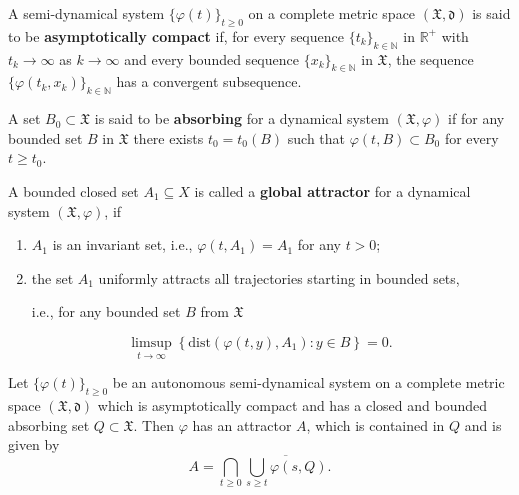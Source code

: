 \documentclass[11pt]{beamer}
\begin{document}

\begin{frame}
    \begin{definition} 
        A semi-dynamical
         system $\{\varphi(t)\}_{t \geq 0}$ on a 
         complete metric space $(\mathfrak{X}, \mathfrak{d})$ is 
         said to be \textbf{asymptotically compact} if, 
         for every sequence $\{t_k\}_{k \in \mathbb{N}}$ 
         in $\mathbb{R}^+$ with $t_k \rightarrow \infty$ 
         as $k \rightarrow \infty$ and every bounded 
         sequence $\{x_k\}_{k \in \mathbb{N}}$ in 
         $\mathfrak{X}$, the sequence 
         $\{\varphi(t_k, x_k)\}_{k \in \mathbb{N}}$ has a 
         convergent subsequence.
    \end{definition}
    \begin{definition}
    A set $B_0 \subset \mathfrak{X}$ is said to be \textbf{absorbing} for a dynamical system $(\mathfrak{X}, \varphi)$ if for any bounded set $B$ in $\mathfrak{X}$ there exists $t_0 = t_0(B)$ such that $\varphi(t, B) \subset B_0$ for every $t \geq t_0$.
    \end{definition}

\end{frame}

\begin{frame}
    A bounded closed set $A_1 \subseteq X$ is called a \textbf{global attractor} for a dynamical system $(\mathfrak{X}, \varphi)$, if
\begin{enumerate}
\item $A_1$ is an invariant set, i.e., $\varphi(t, A_1) = A_1$ for any $t > 0$;

\item the set $A_1$ uniformly attracts all trajectories starting in bounded sets,

i.e., for any bounded set $B$ from $\mathfrak{X}$

\end{enumerate}
$$\limsup_{t \to \infty} \left\{ \mathrm{dist}(\varphi(t, y), A_1) : y \in B \right\} = 0.$$
\end{frame}

\begin{frame}
    \begin{Theorem} Let $\{\varphi(t)\}_{t \geq 0}$ be an autonomous semi-dynamical system on a complete metric space $(\mathfrak{X}, \mathfrak{d})$ which is asymptotically compact and has a closed and bounded absorbing set $Q \subset \mathfrak{X}$. Then $\varphi$ has an attractor $A$, which is contained in $Q$ and is given by
        \[
        A = \bigcap_{t \geq 0} \overline{\bigcup_{s \geq t} \varphi(s, Q)}.
        \]
        
    \end{Theorem}
    
\end{frame}
\end{document}
